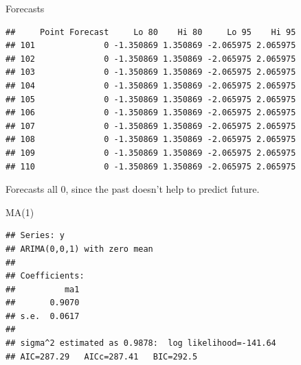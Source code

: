 \begin{frame}[fragile]{Forecasts}
  
{\small  
\begin{knitrout}
\color{fgcolor}\begin{kframe}
\begin{alltt}
\end{alltt}
\begin{verbatim}
##     Point Forecast     Lo 80    Hi 80     Lo 95    Hi 95
## 101              0 -1.350869 1.350869 -2.065975 2.065975
## 102              0 -1.350869 1.350869 -2.065975 2.065975
## 103              0 -1.350869 1.350869 -2.065975 2.065975
## 104              0 -1.350869 1.350869 -2.065975 2.065975
## 105              0 -1.350869 1.350869 -2.065975 2.065975
## 106              0 -1.350869 1.350869 -2.065975 2.065975
## 107              0 -1.350869 1.350869 -2.065975 2.065975
## 108              0 -1.350869 1.350869 -2.065975 2.065975
## 109              0 -1.350869 1.350869 -2.065975 2.065975
## 110              0 -1.350869 1.350869 -2.065975 2.065975
\end{verbatim}
\end{kframe}
\end{knitrout}
}

Forecasts all 0, since the past doesn't help to predict future.

\end{frame}

\begin{frame}[fragile]{MA(1)}
  
\begin{knitrout}
\color{fgcolor}\begin{kframe}
\begin{alltt}
\hlkwb{=}
\end{alltt}
\begin{verbatim}
## Series: y 
## ARIMA(0,0,1) with zero mean     
## 
## Coefficients:
##          ma1
##       0.9070
## s.e.  0.0617
## 
## sigma^2 estimated as 0.9878:  log likelihood=-141.64
## AIC=287.29   AICc=287.41   BIC=292.5
\end{verbatim}
\begin{alltt}
\hlkwb{=}
\end{alltt}
\end{kframe}
\end{knitrout}
  
\end{frame}

